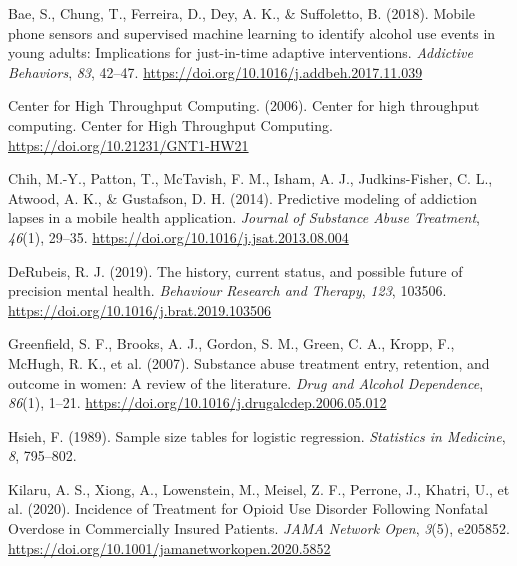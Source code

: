\documentclass[
]{agujournal2019}
\newlength{\cslhangindent}
\newenvironment{CSLReferences}[2] %
 {\begin{list}{}{%
  \setlength{\itemindent}{0pt}
  \setlength{\leftmargin}{0pt}
  \setlength{\parsep}{0pt}
  \ifodd #1
   \setlength{\leftmargin}{\cslhangindent}
   \setlength{\itemindent}{-1\cslhangindent}
  \fi
  \setlength{\itemsep}{#2\baselineskip}}}
 {\end{list}}
\begin{document}
\label{refs}
\begin{CSLReferences}{1}{0}
\vspace{1em}

Bae, S., Chung, T., Ferreira, D., Dey, A. K., \& Suffoletto, B. (2018).
Mobile phone sensors and supervised machine learning to identify alcohol
use events in young adults: {Implications} for just-in-time adaptive
interventions. \emph{Addictive Behaviors}, \emph{83}, 42--47.
\url{https://doi.org/10.1016/j.addbeh.2017.11.039}

Center for High Throughput Computing. (2006). Center for high throughput
computing. Center for High Throughput Computing.
\url{https://doi.org/10.21231/GNT1-HW21}

Chih, M.-Y., Patton, T., McTavish, F. M., Isham, A. J., Judkins-Fisher,
C. L., Atwood, A. K., \& Gustafson, D. H. (2014). Predictive modeling of
addiction lapses in a mobile health application. \emph{Journal of
Substance Abuse Treatment}, \emph{46}(1), 29--35.
\url{https://doi.org/10.1016/j.jsat.2013.08.004}

DeRubeis, R. J. (2019). The history, current status, and possible future
of precision mental health. \emph{Behaviour Research and Therapy},
\emph{123}, 103506. \url{https://doi.org/10.1016/j.brat.2019.103506}

Greenfield, S. F., Brooks, A. J., Gordon, S. M., Green, C. A., Kropp,
F., McHugh, R. K., et al. (2007). Substance abuse treatment entry,
retention, and outcome in women: {A} review of the literature.
\emph{Drug and Alcohol Dependence}, \emph{86}(1), 1--21.
\url{https://doi.org/10.1016/j.drugalcdep.2006.05.012}

Hsieh, F. (1989). Sample size tables for logistic regression.
\emph{Statistics in Medicine}, \emph{8}, 795--802.

Kilaru, A. S., Xiong, A., Lowenstein, M., Meisel, Z. F., Perrone, J.,
Khatri, U., et al. (2020). Incidence of {Treatment} for {Opioid Use
Disorder Following Nonfatal Overdose} in {Commercially Insured
Patients}. \emph{JAMA Network Open}, \emph{3}(5), e205852.
\url{https://doi.org/10.1001/jamanetworkopen.2020.5852}


\end{CSLReferences}
\end{document}
